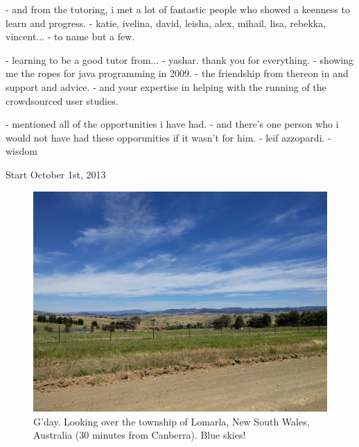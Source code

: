 \begin{preamble}
        - and from the tutoring, i met a lot of fantastic people who showed a keenness to learn and progress.
            - katie, ivelina, david, leisha, alex, mihail, lisa, rebekka, vincent...
            - to name but a few.
    
    - learning to be a good tutor from...
    - yashar. thank you for everything.
        - showing me the ropes for java programming in 2009.
        - the friendship from thereon in and support and advice.
        - and your expertise in helping with the running of the crowdsourced user studies.



- mentioned all of the opportunities i have had.
- and there's one person who i would not have had these opporunities if it wasn't for him.
- leif azzopardi.
- wisdom



Start October 1st, 2013





\renewcommand{\figurename}{Picture}
\begin{figure}
    \begin{center}
    \vspace*{-9mm}
    \includegraphics[width=1\textwidth]{figures/ch0-australia.jpg}
    \end{center}
    \vspace*{-6mm}
    \caption[]{G'day. Looking over the township of Lomarla, New South Wales, Australia (30 minutes from Canberra). Blue skies!}
    \label{fig:acks_australia}
\end{figure}
\renewcommand{\figurename}{Figure}





\end{preamble}
